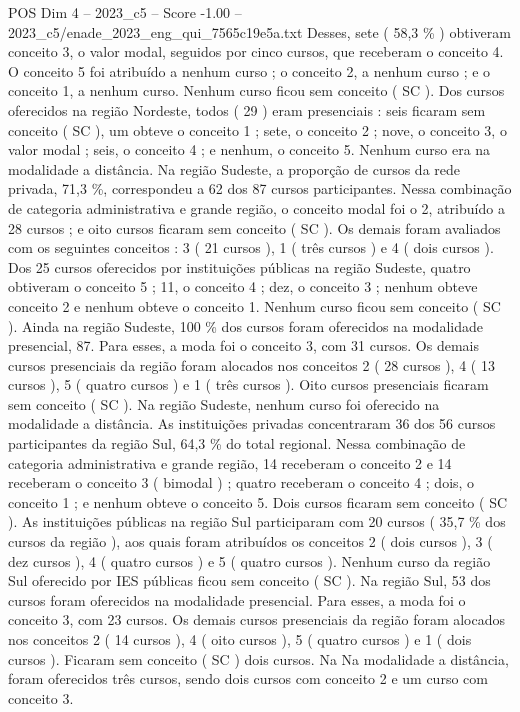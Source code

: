 \begin{textsample}{POS Dim 4 – 2023\_c5 – Score -1.00 – 2023\_c5/enade\_2023\_eng\_qui\_7565c19e5a.txt}
Desses, sete ( 58,3 \% ) obtiveram conceito 3, o valor modal, seguidos por cinco cursos, que receberam o conceito 4.
O conceito 5 foi atribuído a nenhum curso ; o conceito 2, a nenhum curso ; e o conceito 1, a nenhum curso.
Nenhum curso ficou sem conceito ( SC ).
Dos cursos oferecidos na região Nordeste, todos ( 29 ) eram presenciais : seis ficaram sem conceito ( SC ), um obteve o conceito 1 ; sete, o conceito 2 ; nove, o conceito 3, o valor modal ; seis, o conceito 4 ; e nenhum, o conceito 5.
Nenhum curso era na modalidade a distância.
Na região Sudeste, a proporção de cursos da rede privada, 71,3 \%, correspondeu a 62 dos 87 cursos participantes.
Nessa combinação de categoria administrativa e grande região, o conceito modal foi o 2, atribuído a 28 cursos ; e oito cursos ficaram sem conceito ( SC ).
Os demais foram avaliados com os seguintes conceitos : 3 ( 21 cursos ), 1 ( três cursos ) e 4 ( dois cursos ).
Dos 25 cursos oferecidos por instituições públicas na região Sudeste, quatro obtiveram o conceito 5 ; 11, o conceito 4 ; dez, o conceito 3 ; nenhum obteve conceito 2 e nenhum obteve o conceito 1.
Nenhum curso ficou sem conceito ( SC ).
Ainda na região Sudeste, 100 \% dos cursos foram oferecidos na modalidade presencial, 87.
Para esses, a moda foi o conceito 3, com 31 cursos.
Os demais cursos presenciais da região foram alocados nos conceitos 2 ( 28 cursos ), 4 ( 13 cursos ), 5 ( quatro cursos ) e 1 ( três cursos ).
Oito cursos presenciais ficaram sem conceito ( SC ).
Na região Sudeste, nenhum curso foi oferecido na modalidade a distância.
As instituições privadas concentraram 36 dos 56 cursos participantes da região Sul, 64,3 \% do total regional.
Nessa combinação de categoria administrativa e grande região, 14 receberam o conceito 2 e 14 receberam o conceito 3 ( bimodal ) ; quatro receberam o conceito 4 ; dois, o conceito 1 ; e nenhum obteve o conceito 5.
Dois cursos ficaram sem conceito ( SC ).
As instituições públicas na região Sul participaram com 20 cursos ( 35,7 \% dos cursos da região ), aos quais foram atribuídos os conceitos 2 ( dois cursos ), 3 ( dez cursos ), 4 ( quatro cursos ) e 5 ( quatro cursos ).
Nenhum curso da região Sul oferecido por IES públicas ficou sem conceito ( SC ).
Na região Sul, 53 dos cursos foram oferecidos na modalidade presencial.
Para esses, a moda foi o conceito 3, com 23 cursos.
Os demais cursos presenciais da região foram alocados nos conceitos 2 ( 14 cursos ), 4 ( oito cursos ), 5 ( quatro cursos ) e 1 ( dois cursos ).
Ficaram sem conceito ( SC ) dois cursos.
Na Na modalidade a distância, foram oferecidos três cursos, sendo dois cursos com conceito 2 e um curso com conceito 3.

\end{textsample}
